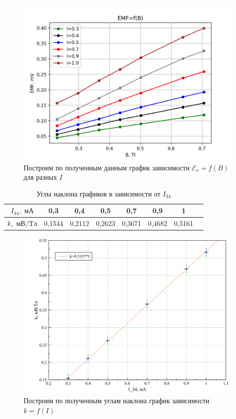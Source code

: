 \documentclass[a4paper, 12pt]{article}
\begin{document}
	\begin {figure}[H]
		\begin{center}
			\includegraphics[width = 0.9 \textwidth]{emf}
			\caption{Построим по полученным данным график зависимости $\mathscr{E}_x = f(B)$ для разных $I$}
		\end{center}
	\end {figure}

\begin{table}[H]
	\centering
		\begin{tabular}{|c|c|c|c|c|c|c|c|}
			\hline
			$I_{34}, \text{ мА}$&	0,3	&0,4&	0,5	&	0,7	&0,9&	1 \\ \hline
			$k, \text{ мВ/Tл}	$&0,1544	&0,2112	&0,2623	&	0,3671&	0,4682&	0,5161 \\ \hline
		\end{tabular}
	\caption{Углы наклона графиков в зависимости от $I_{34}$}
\end{table}

	\begin {figure}[H]
		\begin{center}
		\includegraphics[width = 0.62 \textwidth]{angle}
			\caption{Построим по полученным углам наклона график зависимости $k = f(I)$}
		\end{center}
	\end {figure}
\end{document}
